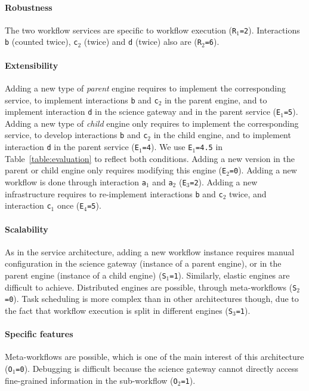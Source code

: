 \documentclass[preprint,3p,twocolumn]{elsarticle}
\begin{document}
\paragraph{Robustness} The two workflow services are specific to
workflow execution (\texttt{R$_1$=2}). Interactions \texttt{b}
(counted twice), \texttt{c$_2$} (twice) and \texttt{d} (twice) also
are (\texttt{R$_2$=6}).

\paragraph{Extensibility} Adding a new type of \emph{parent} engine
requires to implement the corresponding service, to implement
interactions \texttt{b} and \texttt{c$_2$} in the parent engine, and
to implement interaction \texttt{d} in the science gateway and in the
parent service (\texttt{E$_1$=5}). Adding a new type of \emph{child}
engine only requires to implement the corresponding service, to
develop interactions \texttt{b} and \texttt{c$_2$} in the child
engine, and to implement interaction \texttt{d} in the parent service
(\texttt{E$_1$=4}). We use \texttt{E$_1$=4.5} in
Table~\ref{table:evaluation} to reflect both conditions. Adding a new
version in the parent or child engine only requires modifying this
engine (\texttt{E$_2$=0}). Adding a new
workflow is done through interaction \texttt{a$_1$} and \texttt{a$_2$}
(\texttt{E$_3$=2}). Adding a new infrastructure requires to
re-implement interactions \texttt{b} and \texttt{c$_2$} twice, and
interaction \texttt{c$_1$} once (\texttt{E$_4$=5}).

\paragraph{Scalability} As in the service architecture, adding a new
workflow instance requires manual configuration in the science gateway
(instance of a parent engine), or in the parent engine (instance of a
child engine) (\texttt{S$_1$=1}). Similarly, elastic engines are
difficult to achieve. Distributed engines are
possible, through meta-workflows (\texttt{S$_2$=0}). Task scheduling
is more complex than in other architectures though, due to the fact
that workflow execution is split in different engines (\texttt{S$_3$=1}).

\paragraph{Specific features}
Meta-workflows are possible, which is one of the main interest of this
architecture (\texttt{O$_1$=0}).  Debugging is difficult because the
science gateway cannot directly access fine-grained information in the
sub-workflow (\texttt{O$_2$=1}).
\end{document}
